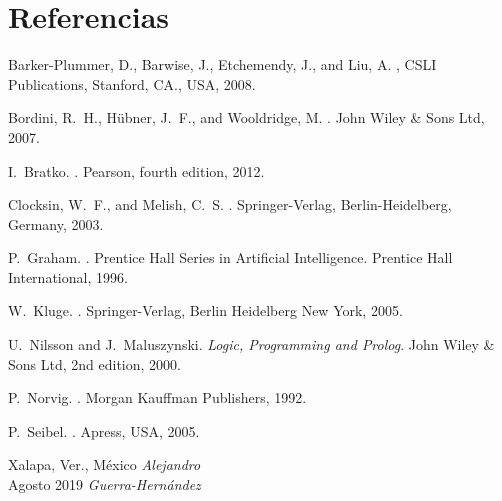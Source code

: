 \documentclass[10pt]{article}
\begin{document}
\section*{Referencias}

\begin{enumerate}
 {\sc Barker-Plummer, D., Barwise, J.,
    Etchemendy, J., and Liu, A.}  , \newblock CSLI Publications, Stanford, CA.,
  USA, 2008.

 {\sc Bordini, R.~H., H{\"u}bner, J.~F., and
    Wooldridge, M.}  .  \newblock John Wiley \& Sons Ltd, 2007.

 {\sc I.~Bratko.}  .  \newblock Pearson,
  fourth edition, 2012.

 {\sc Clocksin, W.~F., and Melish, C.~S.}
  .
  \newblock Springer-Verlag, Berlin-Heidelberg, Germany, 2003.

 {\sc P.~Graham.}  .  \newblock Prentice Hall Series in Artificial
  Intelligence. Prentice Hall International, 1996.

 {\sc W.~Kluge.}  .  \newblock
  Springer-Verlag, Berlin Heidelberg New York, 2005.

 {\sc U.~Nilsson and J.~Maluszynski.}  \newblock
  {\em Logic, Programming and Prolog}.  \newblock John Wiley \& Sons
  Ltd, 2nd edition, 2000.

 {\sc P.~Norvig.}  .
  \newblock Morgan Kauffman Publishers, 1992.

 {\sc P.~Seibel.}  .  \newblock Apress, USA, 2005.
\end{enumerate}

\vspace{\baselineskip}
\begin{flushright}\noindent
  Xalapa, Ver., México \hfill {\it Alejandro}\\
  Agosto 2019 \hfill {\it Guerra-Hernández}\\
\end{flushright}
\end{document}
